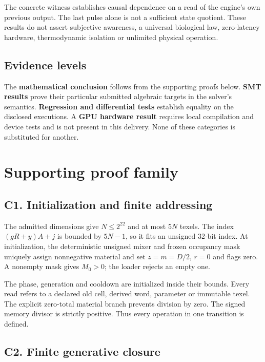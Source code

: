 \documentclass[11pt,a4paper]{article}
\begin{document}
The concrete witness establishes causal dependence on a read of the
engine's own previous output. The last pulse alone is not a sufficient
state quotient. These results do not assert subjective awareness, a
universal biological law, zero-latency hardware, thermodynamic isolation
or unlimited physical operation.

\subsection{Evidence levels}\label{evidence-levels}

The \textbf{mathematical conclusion} follows from the supporting proofs
below. \textbf{SMT results} prove their particular submitted algebraic
targets in the solver's semantics. \textbf{Regression and differential
tests} establish equality on the disclosed executions. A \textbf{GPU
hardware result} requires local compilation and device tests and is not
present in this delivery. None of these categories is substituted for
another.

\clearpage
\section{Supporting proof family}\label{supporting-proof-family}

\subsection{C1. Initialization and finite
addressing}\label{c1.-initialization-and-finite-addressing}

The admitted dimensions give \(N\le2^{22}\) and at most \(5N\) texels.
The index \((gR+y)A+j\) is bounded by \(5N-1\), so it fits an unsigned
32-bit index. At initialization, the deterministic unsigned mixer and
frozen occupancy mask uniquely assign nonnegative material and set
\(z=m=D/2\), \(r=0\) and flags zero. A nonempty mask gives \(M_0>0\);
the loader rejects an empty one.

The phase, generation and cooldown are initialized inside their bounds.
Every read refers to a declared old cell, derived word, parameter or
immutable texel. The explicit zero-total material branch prevents
division by zero. The signed memory divisor is strictly positive. Thus
every operation in one transition is defined.

\subsection{C2. Finite generative
closure}\label{c2.-finite-generative-closure}
\end{document}
